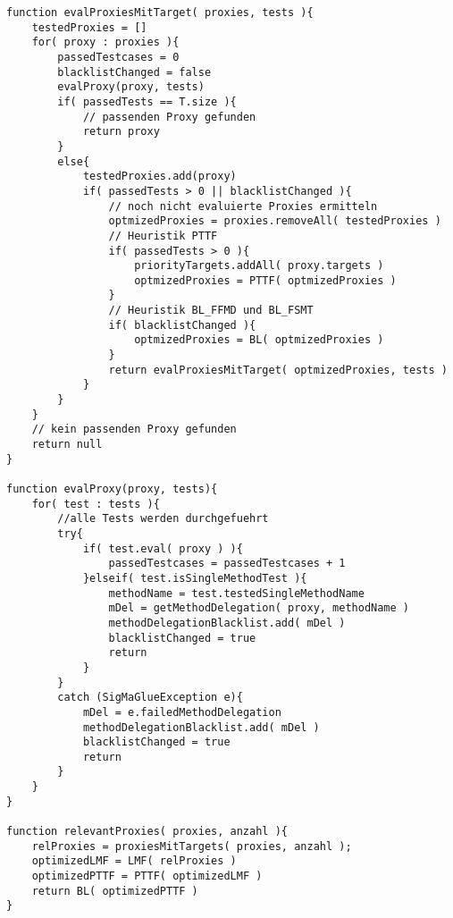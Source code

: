 \documentclass[a4paper,12pt]{article}
\begin{document}
\begin{lstlisting}[style = pseudo, caption = Kombination aller Heuristiken, captionpos = b, label = lst_heuristikkombination]
function evalProxiesMitTarget( proxies, tests ){
	testedProxies = []
	for( proxy : proxies ){
		passedTestcases = 0
		blacklistChanged = false
		evalProxy(proxy, tests)
		if( passedTests == T.size ){
			// passenden Proxy gefunden
			return proxy
		}
		else{
			testedProxies.add(proxy)
			if( passedTests > 0 || blacklistChanged ){
				// noch nicht evaluierte Proxies ermitteln
				optmizedProxies = proxies.removeAll( testedProxies )
				// Heuristik PTTF
				if( passedTests > 0 ){
					priorityTargets.addAll( proxy.targets )
					optmizedProxies = PTTF( optmizedProxies )	
				}
				// Heuristik BL_FFMD und BL_FSMT
				if( blacklistChanged ){
					optmizedProxies = BL( optmizedProxies )	
				}
				return evalProxiesMitTarget( optmizedProxies, tests )
			}
		}
	}
	// kein passenden Proxy gefunden
	return null
}

function evalProxy(proxy, tests){
	for( test : tests ){
		//alle Tests werden durchgefuehrt	
		try{
			if( test.eval( proxy ) ){
				passedTestcases = passedTestcases + 1
			}elseif( test.isSingleMethodTest ){
				methodName = test.testedSingleMethodName
				mDel = getMethodDelegation( proxy, methodName )
				methodDelegationBlacklist.add( mDel )
				blacklistChanged = true
				return
			}
		}
		catch (SigMaGlueException e){
			mDel = e.failedMethodDelegation
			methodDelegationBlacklist.add( mDel )
			blacklistChanged = true
			return
		} 
	}
}

function relevantProxies( proxies, anzahl ){
	relProxies = proxiesMitTargets( proxies, anzahl );
	optimizedLMF = LMF( relProxies )
	optimizedPTTF = PTTF( optimizedLMF )
	return BL( optimizedPTTF )
} 


\end{lstlisting}
\end{document}
